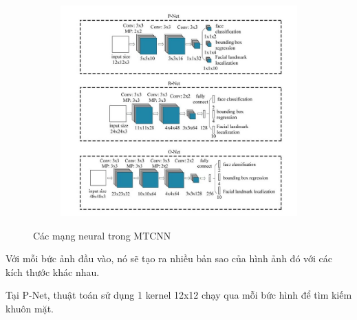 \begin{figure}
    \begin{subfigure}{1.\textwidth}
        \begin{center}
            \includegraphics[width=1.\linewidth]{Chapters/items/chap2_9.jpg}
        \end{center}
        \label{fig: chap2_9}
    \end{subfigure}
    \caption{Các mạng neural trong MTCNN}
\end{figure}

\newpage
Với mỗi bức ảnh đầu vào, nó sẽ tạo ra nhiều bản sao của hình ảnh đó với các kích thước khác nhau.

Tại P-Net, thuật toán sử dụng 1 kernel 12x12 chạy qua mỗi bức hình để tìm kiếm khuôn mặt.

